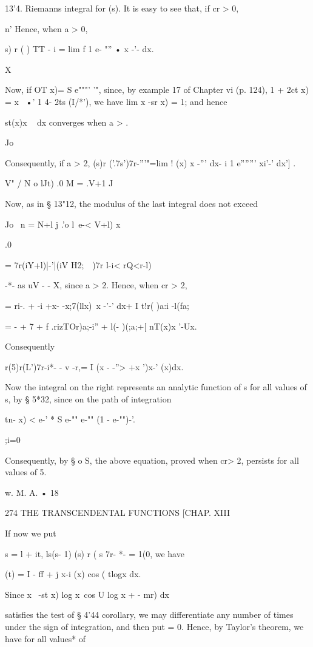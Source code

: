 13'4. Riemanns integral for (s). It is easy to see that, if cr > 0,

n' Hence, when a > 0,

   s) r ( ) TT - i = lim f 1 e- "'' • x -'- dx.

X

Now, if OT x)= S e"""' '", since, by example 17 of Chapter vi (p.
124), 1 + 2ct x) = x~ •' 1 4- 2ts (I/*'), we have lim x -sr x) = 1;
and hence

 st(x)x ~ dx converges when a > .

Jo

Consequently, if a > 2, (s)r ('.7s')7r-'''"=lim ! (x) x -''' dx- i 1
e''''''' xi'-' dx'] .

V" / N o lJt) .0 M = .V+1 J

Now, as in § 13"12, the modulus of the last integral does not exceed

Jo \ n = N+l j .'o l\ e-< V+l) x

.0

= 7r(iY+l)|-'|(iV H2;\ \ )7r l-i< rQ<r-l)

-*- as uV - - X, since a > 2. Hence, when cr > 2,

= ri-. + -i +x- -x;7(llx)\ x -'-' dx+ I t!r( )a:i -l(fa;

= - + 7 + f .rizTOr)a;-i'' + l(- )(;a;+[ nT(x)x '-Ux.

Consequently

r(5)r(L')7r-i*- - v -r,= I (x - -''> +x ')x-' (x)dx.

Now the integral on the right represents an analytic function of s for
all values of s, by § 5*32, since on the path of integration

tn- x) < e-' * S e-"" e-"" (1 - e-"")-'.

;i=0

Consequently, by § o S, the above equation, proved when cr> 2,
persists for all values of 5.

w. M. A. • 18

274 THE TRANSCENDENTAL FUNCTIONS [CHAP. XIII

If now we put

s = l + it, ls(s- 1) (s) r ( s 7r- *- = 1(0, we have

  (t) = I - ff + j x-i (x) cos ( tlogx dx.

Since x~ -st x) log x\ cos U log x + - mr) dx

satisfies the test of § 4'44 corollary, we may differentiate any
number of times under the sign of integration, and then put = 0.
Hence, by Taylor's theorem, we have for all values* of


